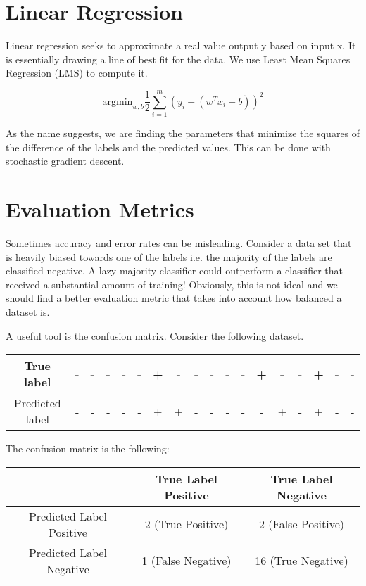 \section*{Linear Regression}
Linear regression seeks to approximate a real value output y based on input x. It is essentially drawing a line of best fit for the data. We use Least Mean Squares Regression (LMS) to compute it.

$$ \text{argmin}_{w,b}\frac{1}{2} \sum_{i=1}^m (y_i - (w^Tx_i + b))^2 $$

As the name suggests, we are finding the parameters that minimize the squares of the difference of the labels and the predicted values. This can be done with stochastic gradient descent. 

\section{Evaluation Metrics}
Sometimes accuracy and error rates can be misleading. Consider a data set that is heavily biased towards one of the labels i.e. the majority of the labels are classified negative. A lazy majority classifier could outperform a classifier that received a substantial amount of training! Obviously, this is not ideal and we should find a better evaluation metric that takes into account how balanced a dataset is.

A useful tool is the confusion matrix. Consider the following dataset.
\begin{center}
    \begin{tabular} {| c | c | c | c | c | c | c | c | c | c | c | c | c | c | c | c | c | c |}
        \hline
        True label & - & - & - & - & - & + & - & - & - & - & - & + & - & - &  + & - & - \\
        \hline
        Predicted label & - & - & - & - & - & + & + & - & - & - & - & - & + & - &  + & - & - \\
        \hline
    \end{tabular}
\end{center}
\vspace{.5cm}
The confusion matrix is the following:
\begin{center}
    \begin{tabular}{| c | c | c |}
        & True Label Positive & True Label Negative \\
        \hline
        Predicted Label Positive & 2 (True Positive) & 2 (False Positive) \\
        \hline
        Predicted Label Negative & 1 (False Negative) & 16 (True Negative) \\
    \end{tabular}
\end{center}

